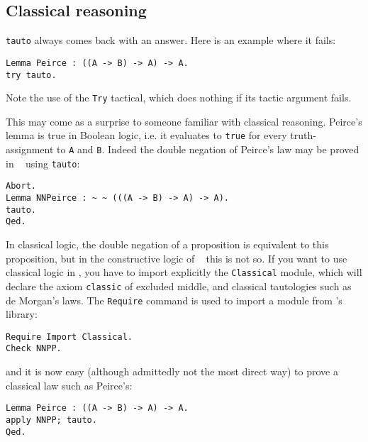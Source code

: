 \documentclass{book}
\begin{document}
\subsection{Classical reasoning}

\verb:tauto: always comes back with an answer. Here is an example where it 
fails:
\begin{lstlisting}
Lemma Peirce : ((A -> B) -> A) -> A.
try tauto.
\end{lstlisting}

Note the use of the \verb:Try: tactical, which does nothing if its tactic
argument fails.

This may come as a surprise to someone familiar with classical reasoning. 
Peirce's lemma is true in Boolean logic, i.e. it evaluates to \verb:true: for 
every truth-assignment to \verb:A: and \verb:B:. Indeed the double negation
of Peirce's law may be proved in \Coq~ using \verb:tauto::
\begin{lstlisting}
Abort.
Lemma NNPeirce : ~ ~ (((A -> B) -> A) -> A).
tauto.
Qed.
\end{lstlisting}

In classical logic, the double negation of a proposition is equivalent to this 
proposition, but in the constructive logic of \Coq~ this is not so. If you 
want to use classical logic in \Coq, you have to import explicitly the
\verb:Classical: module, which will declare the axiom \verb:classic:
of excluded middle, and classical tautologies such as de Morgan's laws.
The \verb:Require: command is used to import a module from \Coq's library:
\begin{lstlisting}
Require Import Classical.
Check NNPP.
\end{lstlisting}

and it is now easy (although admittedly not the most direct way) to prove
a classical law such as Peirce's:
\begin{lstlisting}
Lemma Peirce : ((A -> B) -> A) -> A.
apply NNPP; tauto.
Qed.
\end{lstlisting}
\end{document}

